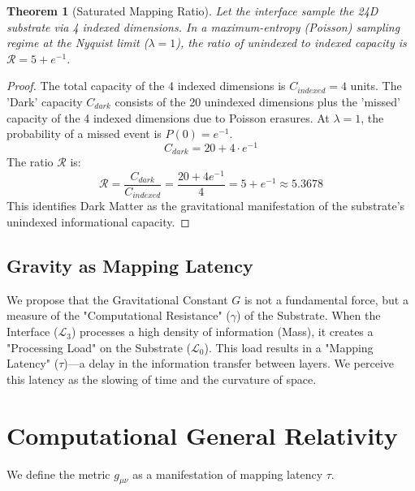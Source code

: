 \documentclass[11pt,titlepage]{article}
\newcommand{\substrate}{\mathcal{L}_0}
\newcommand{\interface}{\mathcal{L}_3}
\newtheorem{theorem}{Theorem}[section]
\begin{document}
\begin{theorem}[Saturated Mapping Ratio]
Let the interface sample the 24D substrate via 4 indexed dimensions. In a maximum-entropy (Poisson) sampling regime at the Nyquist limit ($\lambda=1$), the ratio of unindexed to indexed capacity is $\mathcal{R} = 5 + e^{-1}$.
\end{theorem}
\begin{proof}
The total capacity of the 4 indexed dimensions is $C_{indexed} = 4$ units. The 'Dark' capacity $C_{dark}$ consists of the 20 unindexed dimensions plus the 'missed' capacity of the 4 indexed dimensions due to Poisson erasures. At $\lambda=1$, the probability of a missed event is $P(0) = e^{-1}$.
\begin{equation}
C_{dark} = 20 + 4 \cdot e^{-1}
\end{equation}
The ratio $\mathcal{R}$ is:
\begin{equation}
\mathcal{R} = \frac{C_{dark}}{C_{indexed}} = \frac{20 + 4e^{-1}}{4} = 5 + e^{-1} \approx 5.3678
\end{equation}
This identifies Dark Matter as the gravitational manifestation of the substrate's unindexed informational capacity.
\end{proof}

\subsection{Gravity as Mapping Latency}
We propose that the Gravitational Constant $G$ is not a fundamental force, but a measure of the "Computational Resistance" ($\gamma$) of the Substrate. When the Interface ($\interface$) processes a high density of information (Mass), it creates a "Processing Load" on the Substrate ($\substrate$). This load results in a "Mapping Latency" ($\tau$)---a delay in the information transfer between layers. We perceive this latency as the slowing of time and the curvature of space.


\section{Computational General Relativity}
\label{sec:cgr}
We define the metric $g_{\mu\nu}$ as a manifestation of mapping latency $\tau$.
\end{document}
